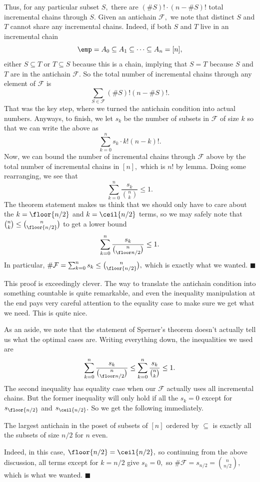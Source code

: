 Thus, for any particular subset $S,$ there are $(\#S)!\cdot(n-\#S)!$ total incremental chains through $S.$ Given an antichain $\mathcal F,$ we note that distinct $S$ and $T$ cannot share any incremental chains. Indeed, if both $S$ and $T$ live in an incremental chain
\[\emp=A_0\subseteq A_1\subseteq\cdots\subseteq A_n=[n],\]
either $S\subseteq T$ or $T\subseteq S$ because this is a chain, implying that $S=T$ because $S$ and $T$ are in the antichain $\mathcal F.$ So the total number of incremental chains through any element of $\mathcal F$ is
\[\sum_{S\in\mathcal F}(\#S)!(n-\#S)!.\]
That was the key step, where we turned the antichain condition into actual numbers. Anyways, to finish, we let $s_k$ be the number of subsets in $\mathcal F$ of size $k$ so that we can write the above as
\[\sum_{k=0}^ns_k\cdot k!(n-k)!.\]
Now, we can bound the number of incremental chains through $\mathcal F$ above by the total number of incremental chains in $[n],$ which is $n!$ by lemma. Doing some rearranging, we see that
\[\sum_{k=0}^n\frac{s_k}{\binom nk}\le1.\]
The theorem statement makes us think that we should only have to care about the $k=\floor{n/2}$ and $k=\ceil{n/2}$ terms, so we may safely note that $\binom nk\le\binom n{\floor{n/2}}$ to get a lower bound
\[\sum_{k=0}^n\frac{s_k}{\binom n{\floor n/2}}\le1.\]
In particular, $\#\mathcal F=\sum_{k=0}^ns_k\le\binom n{\floor{n/2}},$ which is exactly what we wanted. $\blacksquare$

This proof is exceedingly clever. The way to translate the antichain condition into something countable is quite remarkable, and even the inequality manipulation at the end pays very careful attention to the equality case to make sure we get what we need. This is quite nice.

As an aside, we note that the statement of Sperner's theorem doesn't actually tell us what the optimal cases are. Writing everything down, the inequalities we used are
\[\sum_{k=0}^n\frac{s_k}{\binom n{\floor n/2}}\le\sum_{k=0}^n\frac{s_k}{\binom nk}\le1.\]
The second inequality has equality case when our $\mathcal F$ actually uses all incremental chains. But the former inequality will only hold if all the $s_k=0$ except for $s_{\floor{n/2}}$ and $s_{\ceil{n/2}}.$ So we get the following immediately.
\begin{proposition}
    The largest antichain in the poset of subsets of $[n]$ ordered by $\subseteq$ is exactly all the subsets of size $n/2$ for $n$ even.
\end{proposition}
Indeed, in this case, $\floor{n/2}=\ceil{n/2},$ so continuing from the above discussion, all terms except for $k=n/2$ give $s_k=0,$ so $\#\mathcal F=s_{n/2}=\binom n{n/2},$ which is what we wanted. $\blacksquare$

